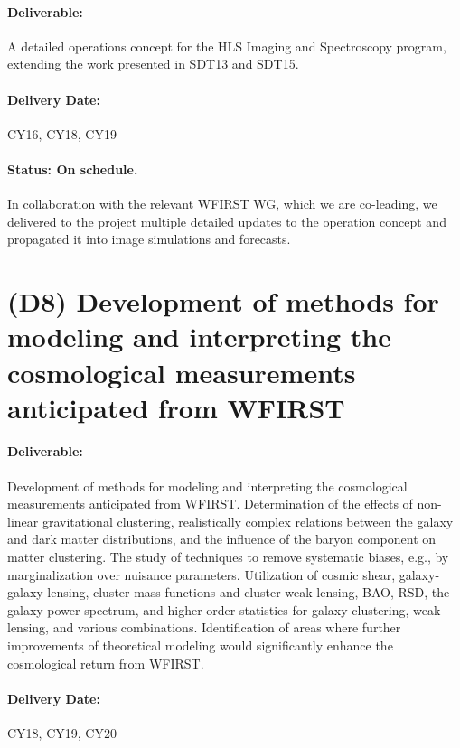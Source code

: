 \paragraph*{Deliverable:} A detailed operations concept for the HLS Imaging and Spectroscopy program, extending the work presented in SDT13 and SDT15.

\paragraph*{Delivery Date:} CY16, CY18, CY19

\paragraph*{Status: On schedule.} In collaboration with the relevant WFIRST WG, which we are co-leading, we delivered to the project multiple detailed updates to the operation concept and propagated it into image simulations and forecasts.


\section*{(D8) Development of methods for modeling and interpreting the cosmological
measurements anticipated from WFIRST}

\paragraph*{Deliverable:} Development of methods for modeling and interpreting the cosmological measurements anticipated from WFIRST. Determination of the effects of non-linear gravitational clustering, realistically complex relations between the
galaxy and dark matter distributions, and the influence of the baryon
component on matter clustering. The study of techniques to
remove systematic biases, e.g., by marginalization over nuisance
parameters. Utilization of cosmic shear, galaxy-galaxy lensing, cluster mass functions and cluster weak lensing, BAO, RSD, the galaxy
power spectrum, and higher order statistics for galaxy clustering, weak
lensing, and various combinations. Identification of areas where
further improvements of theoretical modeling would significantly
enhance the cosmological return from WFIRST.

\paragraph*{Delivery Date:} CY18, CY19, CY20

